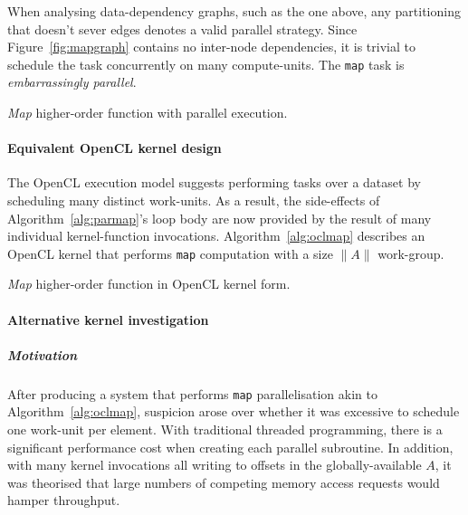 When analysing data-dependency graphs, such as the one above, any partitioning that doesn't sever edges denotes a valid parallel strategy. Since Figure~\ref{fig:mapgraph} contains no inter-node dependencies, it is trivial to schedule the task concurrently on many compute-units. The \verb|map| task is \emph{embarrassingly parallel}.

\begin{algorithm}
  \caption{\emph{Map} higher-order function with parallel execution.}
  \label{alg:parmap}

  \begin{algorithmic}
      \EndPFor
    \EndFunction
  \end{algorithmic}
\end{algorithm}

\paragraph*{Equivalent \ac{OpenCL} kernel design}
The \ac{OpenCL} execution model suggests performing tasks over a dataset by scheduling many distinct work-units. As a result, the side-effects of Algorithm~\ref{alg:parmap}'s loop body are now provided by the result of many individual kernel-function invocations. Algorithm~\ref{alg:oclmap} describes an \ac{OpenCL} kernel that performs \verb|map| computation with a size $\|A\|$ work-group.

\begin{algorithm}
  \caption{\emph{Map} higher-order function in OpenCL kernel form.}
  \label{alg:oclmap}

  \begin{algorithmic}

    \EndFunction
  \end{algorithmic}
\end{algorithm}

\paragraph*{Alternative kernel investigation}
\subparagraph*{Motivation}
After producing a system that performs \verb|map| parallelisation akin to Algorithm~\ref{alg:oclmap}, suspicion arose over whether it was excessive to schedule one work-unit per element. With traditional threaded programming, there is a significant performance cost when creating each parallel subroutine. In addition, with many kernel invocations all writing to offsets in the globally-available $A$, it was theorised that large numbers of competing memory access requests would hamper throughput.

